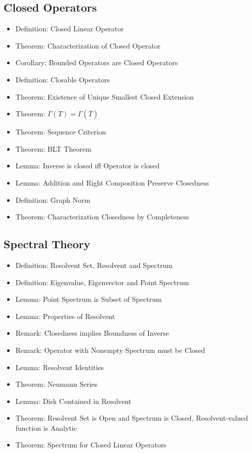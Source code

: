 \documentclass[8pt,twocolumn]{article}
\begin{document}
    \subsection{Closed Operators} %
    \label{sub:closed_operators}
      \begin{itemize}
        \item Definition: Closed Linear Operator
        \item Theorem: Characterization of Closed Operator
        \item Corollary: Bounded Operators are Closed Operators
        \item Definition: Closable Operators
        \item Theorem: Existence of Unique Smallest Closed Extension
        \item Theorem: $\overline{\Gamma(T)} = \Gamma(\overline{T})$
        \item Theorem: Sequence Criterion
        \item Theorem: BLT Theorem
        \item Lemma: Inverse is closed iff Operator is closed
        \item Lemma: Addition and Right Composition Preserve Closedness
        \item Definition: Graph Norm
        \item Theorem: Characterization Closedness by Completeness
      \end{itemize}

    \subsection{Spectral Theory} %
    \label{sub:spectral_theory}
      \begin{itemize}
        \item Definition: Resolvent Set, Resolvent and Spectrum
        \item Definition: Eigenvalue, Eigenvector and Point Spectrum
        \item Lemma: Point Spectrum is Subset of Spectrum
        \item Lemma: Properties of Resolvent
        \item Remark: Closedness implies Boundness of Inverse
        \item Remark: Operator with Nonempty Spectrum must be Closed
        \item Lemma: Resolvent Identities
        \item Theorem: Neumann Series
        \item Lemma: Disk Contained in Resolvent
        \item Theorem: Resolvent Set is Open and Spectrum is Closed, Resolvent-valued function is Analytic
        \item Theorem: Spectrum for Closed Linear Operators
      \end{itemize}
\end{document}
